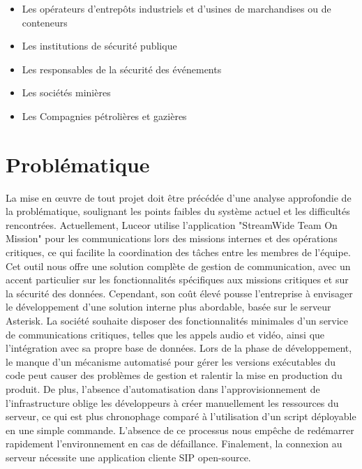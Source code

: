 \begin{itemize}
    \item Les opérateurs d'entrepôts industriels et d'usines de marchandises ou de conteneurs
    \item Les institutions de sécurité publique
    \item Les responsables de la sécurité des événements
    \item Les sociétés minières
    \item Les Compagnies pétrolières et gazières
\end{itemize}

\section{Problématique}
La mise en œuvre de tout projet doit être précédée d'une analyse approfondie de la problématique, soulignant les points faibles du système actuel et les difficultés rencontrées. Actuellement, Luceor utilise l'application "StreamWide Team On Mission" pour les communications lors des missions internes et des opérations critiques, ce qui facilite la coordination des tâches entre les membres de l'équipe. Cet outil nous offre une solution complète de gestion de communication, avec un accent particulier sur les fonctionnalités spécifiques aux missions critiques et sur la sécurité des données. Cependant, son coût élevé pousse l'entreprise à envisager le développement d'une solution interne plus abordable, basée sur le serveur Asterisk. La société souhaite disposer des fonctionnalités minimales d'un service de communications critiques, telles que les appels audio et vidéo, ainsi que l'intégration avec sa propre base de données. Lors de la phase de développement, le manque d'un mécanisme automatisé pour gérer les versions exécutables du code peut causer des problèmes de gestion et ralentir la mise en production du produit. De plus, l'absence d'automatisation dans l'approvisionnement de l'infrastructure oblige les développeurs à créer manuellement les ressources du serveur, ce qui est plus chronophage comparé à l'utilisation d'un script déployable en une simple commande. L'absence de ce processus nous empêche de redémarrer rapidement l'environnement en cas de défaillance. Finalement, la connexion au serveur nécessite une application cliente SIP open-source.

